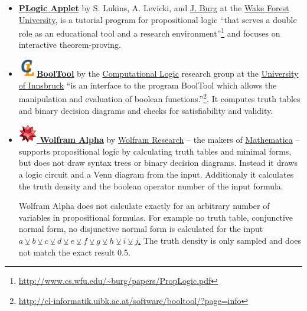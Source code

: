 \begin{itemize}
\item 
\href{http://www.cs.wfu.edu/~burg/JavaPackages/indexswingnet.html}{\bf PLogic Applet} 
by S. Lukins, A. Levicki, and 
\href{http://www.cs.wfu.edu/~burg}{J. Burg} at the
\href{http://www.cs.wfu.edu}{Wake Forest University}, is a
tutorial program for propositional logic 
“that serves a double role as an educational tool and a research environment”\footnote {
\url{http://www.cs.wfu.edu/~burg/papers/PropLogic.pdf}} and focuses 
 on interactive theorem-proving.

\item
\href{http://cl-informatik.uibk.ac.at/software/booltool/}{\bf 
\includegraphics[width=0.8cm]{clshortlogo_new.pdf}BoolTool} 
by the 
\href{http://cl-informatik.uibk.ac.at/}{Computational Logic} 
research group at the 
\href{http://informatik.uibk.ac.at}{University of Innsbruck}
“is an interface to the program BoolTool which allows the manipulation and evaluation of boolean functions.”\footnote{
\url{http://cl-informatik.uibk.ac.at/software/booltool/?page=info}}. 
It computes truth tables and binary decision diagrams and checks for satisfiability and validity.

\item
\href{http://www.wolframalpha.com/input/?i=a+or+b+and+c}{\bf 
\includegraphics[width=0.8cm]{related/WolframAlpha.jpg} Wolfram Alpha} 
by 
\href{http://www.wolfram.com/}{Wolfram Research} – the makers of 
\href{http://www.wolfram.com/mathematica/}{Mathematica} – supports
propositional logic by calculating truth tables and minimal forms, 
but does not draw syntax trees or binary decision diagrams.
Instead it draws a logic circuit and a Venn diagram from the input. 
Additionaly it calculates the truth density
and the boolean operator number of the input formula. 

Wolfram Alpha does not calculate exactly for an arbitrary number of variables in propositional formulas.
For example no truth table, conjunctive normal form, no disjunctive normal form is calculated
for the input
\href{http://www.wolframalpha.com/input/?i=a+xor+b+xor+c+xor+d+xor+e+xor+f+xor+g+xor+h+xor+i+xor+j}{
$a\veebar b\veebar c\veebar d\veebar e\veebar f\veebar g\veebar h\veebar i\veebar j$.}
The truth density is only sampled and does not match the exact result 0.5.
\end{itemize}

